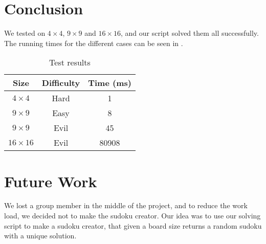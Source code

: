 \documentclass[12pt, a4paper, titlepage]{article}
\begin{document}
\section*{Conclusion}
We tested on $4 \times 4$, $9 \times 9$ and $16 \times 16$, and our script solved them all successfully. The running times for the different cases can be seen in .    

\begin{table}[]
\centering
\begin{tabular}{c|c|c}
\textbf{Size }        &\textbf{ Difficulty }& \textbf{Time (ms)} \\ \hline
$4 \times 4$ & Hard       & 1         \\ \hline
$9 \times 9$ & Easy       & 8         \\ \hline
$9 \times 9$ & Evil       & 45        \\ \hline
$16 \times 16$ & Evil     & 80908     \\ 
\end{tabular}
\caption{Test results}
\label{tab1}
\end{table} 

\section*{Future Work}
We lost a group member in the middle of the project, and to reduce the work load, we decided not to make the sudoku creator. Our idea was to use our solving script to make a sudoku creator, that given a board size returns a random sudoku with a unique solution. 
\end{document}
